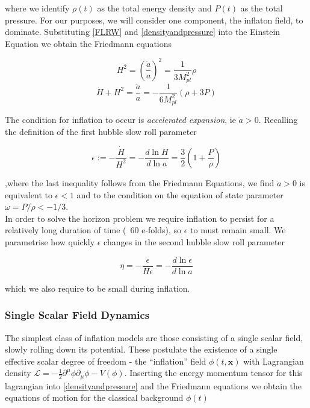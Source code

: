 \documentclass[a4paper,10pt]{article}
\renewcommand{\v}[1]{\mathbf{#1}}
\newcommand{\Mp}{M_{pl}}
\newcommand{\half}{\frac{1}{2}}
\begin{document}
where we  identify $\rho(t)$ as the total energy density and $P(t)$ as the total pressure. For our purposes, we will consider one component, the inflaton field, to dominate.  Substituting \ref{FLRW} and \ref{densityandpressure} into the Einstein Equation we obtain the Friedmann equations

\begin{equation}
H^2 = (\frac{\dot{a}}{a})^2 = \frac{1}{3\Mp^2}\rho
\tag{F1}
\label{F1}
\end{equation}
\begin{equation}
\dot{H} + H^2 = \frac{\ddot{a}}{a} = -\frac{1}{6\Mp^2}(\rho + 3P)
\tag{F2}
\label{F2}
\end{equation}

The condition for inflation to occur is \textit{accelerated expansion}, ie $\ddot{a} >0$. Recalling the definition of the first hubble slow roll parameter 

\begin{equation}
\label{epsilon}
\epsilon := -\frac{\dot{H}}{H^2} = -\frac{d\ln{H}}{d\ln{a}} = \frac{3}{2}(1+\frac{P}{\rho})
\end{equation}

,where the last inequality follows from the Friedmann Equations, we find $\ddot{a} >0$ is equivalent to $\epsilon<1$ and to the condition on the equation of state parameter $\omega=P/\rho < -1/3$.\\ 

In order to solve the horizon problem we require inflation to persist for a relatively long duration of time (~60 e-folds), so $\epsilon$ to must remain small. We parametrise how quickly $\epsilon$ changes in the second hubble slow roll parameter 

\begin{equation}
\eta = -\frac{\dot{\epsilon}}{H\epsilon} = -\frac{d\ln{\epsilon}}{d\ln{a}}
\end{equation}

which we also require to be small during inflation.

\subsubsection{Single Scalar Field Dynamics}

The simplest class of inflation models are those consisting of a single scalar field, slowly rolling down its potential. These postulate the existence of a single effective scalar degree of freedom - the ``inflation'' field $\phi(t,\v{x})$ with Lagrangian density $\mathcal{L} = -\half \partial^\mu \phi \partial_\mu \phi - V(\phi)$. Inserting the energy momentum tensor for this lagrangian into \ref{densityandpressure} and the Friedmann equations we obtain the equations of motion for the classical background $\phi(t)$
\end{document}
